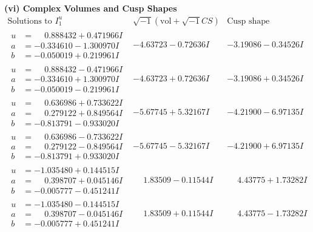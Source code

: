 \documentclass[1p]{elsarticle_modified}
\theoremstyle{definition}
\newcommand{\I}{\sqrt{-1}}
\begin{document}
\newpage\flushleft \textbf{(vi) Complex Volumes and Cusp Shapes}
$$\begin{array}{c|c|c}  
\text{Solutions to }I^u_{1}& \I (\text{vol} + \sqrt{-1}CS) & \text{Cusp shape}\\
 \hline 
\begin{aligned}
u &= \phantom{-}0.888432 + 0.471966 I \\
a &= -0.334610 - 1.300970 I \\
b &= -0.050019 + 0.219961 I\end{aligned}
 & -4.63723 - 0.72636 I & -3.19086 - 0.34526 I \\ \hline\begin{aligned}
u &= \phantom{-}0.888432 - 0.471966 I \\
a &= -0.334610 + 1.300970 I \\
b &= -0.050019 - 0.219961 I\end{aligned}
 & -4.63723 + 0.72636 I & -3.19086 + 0.34526 I \\ \hline\begin{aligned}
u &= \phantom{-}0.636986 + 0.733622 I \\
a &= \phantom{-}0.279122 + 0.849564 I \\
b &= -0.813791 - 0.933020 I\end{aligned}
 & -5.67745 + 5.32167 I & -4.21900 - 6.97135 I \\ \hline\begin{aligned}
u &= \phantom{-}0.636986 - 0.733622 I \\
a &= \phantom{-}0.279122 - 0.849564 I \\
b &= -0.813791 + 0.933020 I\end{aligned}
 & -5.67745 - 5.32167 I & -4.21900 + 6.97135 I \\ \hline\begin{aligned}
u &= -1.035480 + 0.144515 I \\
a &= \phantom{-}0.398707 + 0.045146 I \\
b &= -0.005777 - 0.451241 I\end{aligned}
 & \phantom{-}1.83509 - 0.11544 I & \phantom{-}4.43775 + 1.73282 I \\ \hline\begin{aligned}
u &= -1.035480 - 0.144515 I \\
a &= \phantom{-}0.398707 - 0.045146 I \\
b &= -0.005777 + 0.451241 I\end{aligned}
 & \phantom{-}1.83509 + 0.11544 I & \phantom{-}4.43775 - 1.73282 I \\ \hline\begin{aligned}

\end{aligned}
\end{array}$$
\end{document}
